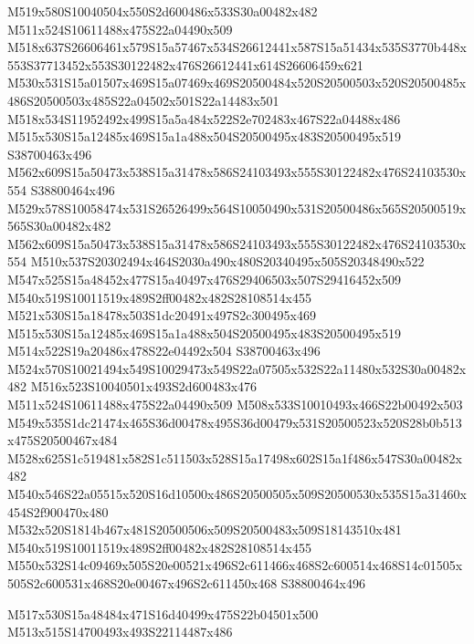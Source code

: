 \documentclass{article}
\begin{document}
\begin{multicols}{2}


M519x580S10040504x550S2d600486x533S30a00482x482 M511x524S10611488x475S22a04490x509 M518x637S26606461x579S15a57467x534S26612441x587S15a51434x535S3770b448x553S37713452x553S30122482x476S26612441x614S26606459x621 M530x531S15a01507x469S15a07469x469S20500484x520S20500503x520S20500485x486S20500503x485S22a04502x501S22a14483x501 M518x534S11952492x499S15a5a484x522S2e702483x467S22a04488x486 M515x530S15a12485x469S15a1a488x504S20500495x483S20500495x519 S38700463x496 M562x609S15a50473x538S15a31478x586S24103493x555S30122482x476S24103530x554 S38800464x496 M529x578S10058474x531S26526499x564S10050490x531S20500486x565S20500519x565S30a00482x482 M562x609S15a50473x538S15a31478x586S24103493x555S30122482x476S24103530x554 M510x537S20302494x464S2030a490x480S20340495x505S20348490x522 M547x525S15a48452x477S15a40497x476S29406503x507S29416452x509 M540x519S10011519x489S2ff00482x482S28108514x455 M521x530S15a18478x503S1dc20491x497S2c300495x469 M515x530S15a12485x469S15a1a488x504S20500495x483S20500495x519 M514x522S19a20486x478S22e04492x504 S38700463x496 M524x570S10021494x549S10029473x549S22a07505x532S22a11480x532S30a00482x482 M516x523S10040501x493S2d600483x476 M511x524S10611488x475S22a04490x509 M508x533S10010493x466S22b00492x503 M549x535S1dc21474x465S36d00478x495S36d00479x531S20500523x520S28b0b513x475S20500467x484 M528x625S1c519481x582S1c511503x528S15a17498x602S15a1f486x547S30a00482x482 M540x546S22a05515x520S16d10500x486S20500505x509S20500530x535S15a31460x454S2f900470x480 M532x520S1814b467x481S20500506x509S20500483x509S18143510x481 M540x519S10011519x489S2ff00482x482S28108514x455 M550x532S14c09469x505S20e00521x496S2c611466x468S2c600514x468S14c01505x505S2c600531x468S20e00467x496S2c611450x468 S38800464x496

\begin{center}
M517x530S15a48484x471S16d40499x475S22b04501x500 M513x515S14700493x493S22114487x486 
\end{center}




\end{multicols}
\end{document}
